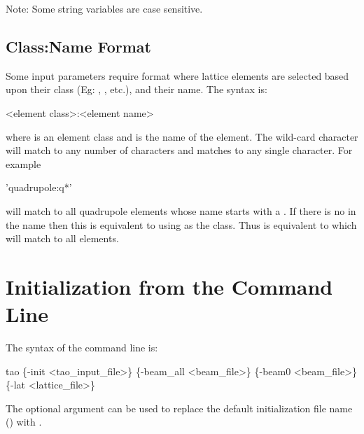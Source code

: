 Note: Some string variables are case sensitive.

\subsection{Class:Name Format}
\label{s:class:name}

Some input parameters require  format where lattice
elements are selected based upon their class (Eg: ,
, etc.), and their name. The syntax is:
\begin{example}
  <element class>:<element name>
\end{example}
where  is an element class and 
is the name of the element.  The wild-card character  will match
to any number of characters and  matches to any
single character.  For example
\begin{example}
  'quadrupole:q*'
\end{example}
will match to all quadrupole elements whose name starts with a
. If there is no  in the name then this is equivalent
to using  as the class.  Thus  is equivalent to
 which will match to all elements.

\section{Initialization from the Command Line}
\label{s:command_line} 

The syntax of the command line is:
\begin{example}
  tao \{-init <tao_input_file>\} \{-beam_all <beam_file>\} 
                          \{-beam0 <beam_file>\} \{-lat <lattice_file>\}
\end{example}

The  optional argument can be used to replace the default
initialization file name () with .

